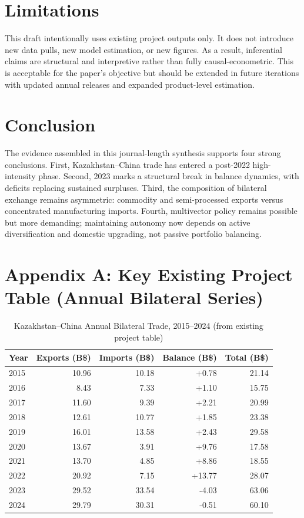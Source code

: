 \documentclass[12pt]{article}
\begin{document}
\section{Limitations}
This draft intentionally uses existing project outputs only. It does not introduce new data pulls, new model estimation, or new figures. As a result, inferential claims are structural and interpretive rather than fully causal-econometric. This is acceptable for the paper's objective but should be extended in future iterations with updated annual releases and expanded product-level estimation.

\section{Conclusion}
The evidence assembled in this journal-length synthesis supports four strong conclusions. First, Kazakhstan--China trade has entered a post-2022 high-intensity phase. Second, 2023 marks a structural break in balance dynamics, with deficits replacing sustained surpluses. Third, the composition of bilateral exchange remains asymmetric: commodity and semi-processed exports versus concentrated manufacturing imports. Fourth, multivector policy remains possible but more demanding; maintaining autonomy now depends on active diversification and domestic upgrading, not passive portfolio balancing.

\appendix
\section{Appendix A: Key Existing Project Table (Annual Bilateral Series)}
\begin{table}[H]
\centering
\small
\caption{Kazakhstan--China Annual Bilateral Trade, 2015--2024 (from existing project table)}
\begin{tabular}{lrrrr}
\toprule
Year & Exports (B\$) & Imports (B\$) & Balance (B\$) & Total (B\$) \\
\midrule
2015 & 10.96 & 10.18 & +0.78 & 21.14 \\
2016 & 8.43 & 7.33 & +1.10 & 15.75 \\
2017 & 11.60 & 9.39 & +2.21 & 20.99 \\
2018 & 12.61 & 10.77 & +1.85 & 23.38 \\
2019 & 16.01 & 13.58 & +2.43 & 29.58 \\
2020 & 13.67 & 3.91 & +9.76 & 17.58 \\
2021 & 13.70 & 4.85 & +8.86 & 18.55 \\
2022 & 20.92 & 7.15 & +13.77 & 28.07 \\
2023 & 29.52 & 33.54 & -4.03 & 63.06 \\
2024 & 29.79 & 30.31 & -0.51 & 60.10 \\
\bottomrule
\end{tabular}
\end{table}
\end{document}

